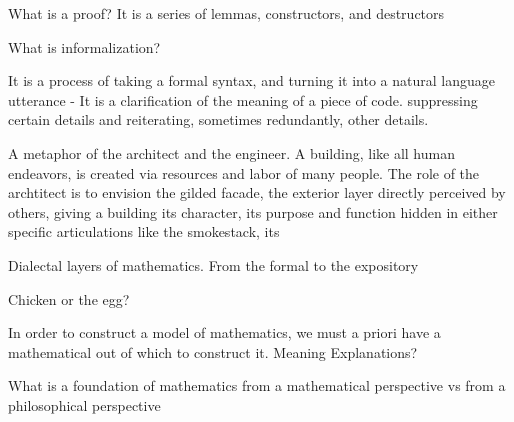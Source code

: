   
What is a proof? It is a series of lemmas, constructors, and destructors

What is informalization? 

It is a process of taking a formal syntax, and turning it into a natural
language utterance -  It is a clarification of the meaning of a piece of
code. suppressing certain details and reiterating, sometimes
redundantly, other details.

A metaphor of the architect and the engineer.  A building, like all human
endeavors, is created via resources and labor of many people. The role of the archtitect
is to envision the gilded facade, the exterior layer directly perceived by
others, giving a building its character, its purpose and function hidden in
either specific articulations like the
smokestack,  its 

Dialectal layers of mathematics.  From the formal to the expository 

Chicken or the egg?

In order to construct a model of mathematics, we must a priori have a
mathematical out of which to construct it.  Meaning Explanations?

What is a foundation of mathematics from a mathematical perspective vs from a
philosophical perspective


